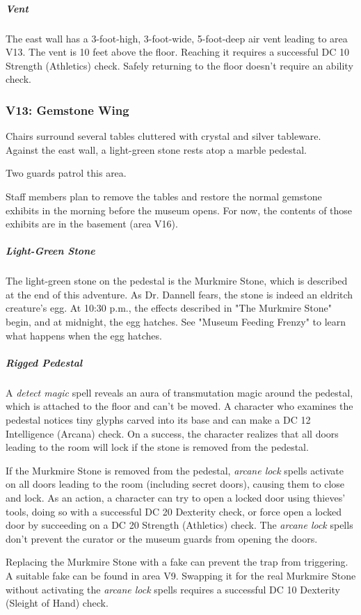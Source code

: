 \documentclass[10pt,a4paper,twoside,bg=print,twocolumn,openany,nodeprecatedcode]{dndbook}
\begin{document}
\subparagraph{Vent}
The east wall has a 3-foot-high, 3-foot-wide, 5-foot-deep air vent leading to area V13. The vent is 10 feet above the floor. Reaching it requires a successful DC 10 Strength (Athletics) check. Safely returning to the floor doesn't require an ability check.

\subsubsection{V13: Gemstone Wing}
\begin{DndReadAloud}{}
Chairs surround several tables cluttered with crystal and silver tableware. Against the east wall, a light-green stone rests atop a marble pedestal.

\end{DndReadAloud}

Two guards patrol this area.

Staff members plan to remove the tables and restore the normal gemstone exhibits in the morning before the museum opens. For now, the contents of those exhibits are in the basement (area V16).

\subparagraph{Light-Green Stone}
The light-green stone on the pedestal is the Murkmire Stone, which is described at the end of this adventure. As Dr. Dannell fears, the stone is indeed an eldritch creature's egg. At 10:30 p.m., the effects described in "The Murkmire Stone" begin, and at midnight, the egg hatches. See "Museum Feeding Frenzy" to learn what happens when the egg hatches.

\subparagraph{Rigged Pedestal}
A \textit{detect magic} spell reveals an aura of transmutation magic around the pedestal, which is attached to the floor and can't be moved. A character who examines the pedestal notices tiny glyphs carved into its base and can make a DC 12 Intelligence (Arcana) check. On a success, the character realizes that all doors leading to the room will lock if the stone is removed from the pedestal.

If the Murkmire Stone is removed from the pedestal, \textit{arcane lock} spells activate on all doors leading to the room (including secret doors), causing them to close and lock. As an action, a character can try to open a locked door using thieves' tools, doing so with a successful DC 20 Dexterity check, or force open a locked door by succeeding on a DC 20 Strength (Athletics) check. The \textit{arcane lock} spells don't prevent the curator or the museum guards from opening the doors.

Replacing the Murkmire Stone with a fake can prevent the trap from triggering. A suitable fake can be found in area V9. Swapping it for the real Murkmire Stone without activating the \textit{arcane lock} spells requires a successful DC 10 Dexterity (Sleight of Hand) check.
\end{document}
